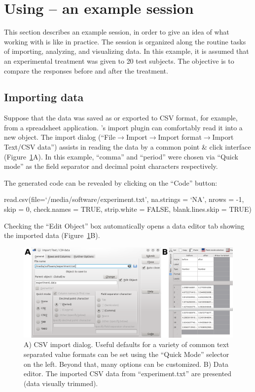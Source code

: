 \section[Using RKWard -- an example session]{Using  -- an example session}
\label{sec:using_RKWard}
This section describes an example  session, in order to give an idea
of what working with  is like in practice.
The session is organized along the routine tasks of importing,
analyzing, and visualizing data. In this example, it is assumed that an experimental
treatment was given to 20 test subjects. The objective is to compare the responses 
before and after the treatment. 

\subsection{Importing data}
\label{sec:importing_data}
Suppose that the data was saved as or exported to CSV format, for example, from a 
spreadsheet application. 's import plugin can
comfortably read it into a new  object.
The import dialog (``File$\rightarrow$Import$\rightarrow$Import
format$\rightarrow$Import Text/CSV data'') assists in reading the
data by a common point \& click interface (Figure~\ref{fig:import_data}A). In this
example, ``comma'' and ``period'' were chosen via ``Quick mode'' as the field
separator and decimal point characters respectively.

The generated  code can be revealed by clicking on the ``Code'' button:

\begin{Code}
read.csv(file=`/media/software/experiment.txt',
         na.strings = `NA', nrows = -1, skip = 0,
         check.names = TRUE, strip.white = FALSE, blank.lines.skip = TRUE)
\end{Code}

Checking the ``Edit Object'' box automatically opens a data editor tab
showing the imported data (Figure~\ref{fig:import_data}B).

\begin{figure}[b!]
 \centering
 \includegraphics[width=13.5cm]{./figures/import_data.png}
 \caption{A) CSV import dialog. Useful defaults for a variety of common text separated value formats can
  be set using the ``Quick Mode'' selector on the left. Beyond that, many options can be customized. B) Data editor. The imported CSV
  data from ``experiment.txt'' are presented (data visually trimmed).}
 \label{fig:import_data}
\end{figure}
\newpage
